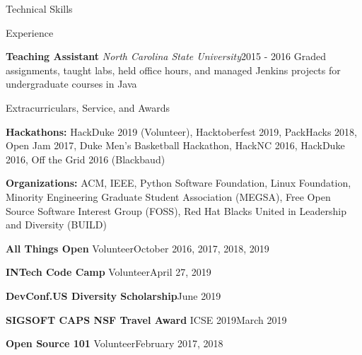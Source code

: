 \documentclass{resume} %
\begin{document}
\begin{rSection}{Technical Skills}
\begin{rSection}{Experience}
\begin{eSubsection}{\small \textbf{Teaching Assistant} \textit{North Carolina State University}}{\small 2015 - 2016}
{\small Graded assignments, taught labs, held office hours, and managed Jenkins projects for undergraduate courses in Java}
\end{eSubsection}
\vspace{-10pt}
\end{rSection}
\begin{rSection}{Extracurriculars, Service, and Awards}
\vspace{-5pt}
\begin{spacing}{0.25}
{\small \textbf{Hackathons:} HackDuke 2019 (Volunteer), Hacktoberfest 2019, PackHacks 2018, Open Jam 2017, Duke Men's Basketball Hackathon, HackNC 2016, HackDuke 2016, Off the Grid 2016 (Blackbaud)}
\end{spacing}
\vspace{5pt}
\begin{spacing}{0.25}
{\small \textbf{Organizations:} ACM, IEEE, Python Software Foundation, Linux Foundation, Minority Engineering Graduate Student Association (MEGSA), Free Open Source Software Interest Group (FOSS), Red Hat Blacks United in Leadership and Diversity (BUILD)}
\end{spacing}
\vspace{5pt}
\begin{sSubsection}
{\small \textbf{All Things Open} Volunteer}{October 2016, 2017, 2018, 2019} 
\end{sSubsection}
\vspace{-8pt}
\begin{sSubsection}
{\small \textbf{INTech Code Camp} Volunteer}{April 27, 2019} 
\end{sSubsection}
\vspace{-8pt}
\begin{sSubsection}
{\small \textbf{DevConf.US Diversity Scholarship}}{June 2019} 
\end{sSubsection}
\vspace{-8pt}
\begin{sSubsection}
{\small \textbf{SIGSOFT CAPS NSF Travel Award} ICSE 2019}{March 2019} 
\end{sSubsection}
\vspace{-8pt}
\begin{sSubsection}
{\small \textbf{Open Source 101} Volunteer}{February 2017, 2018} 
\end{sSubsection}




\end{rSection}
\end{rSection}
\end{document}
